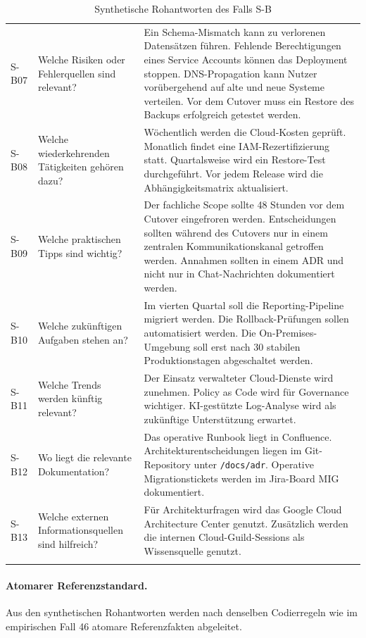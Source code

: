 \documentclass[
  10pt,
  ngerman,
  a4paper,
  toc=graduated,
  numbers=noenddot,
  headings=standardclasses,
  nonumberlist
]{scrartcl}
\newcommand{\code}[1]{\nolinkurl{#1}}
\begin{document}
\begin{longtable}{L{1.0cm}L{4.2cm}L{9.8cm}}
S-B07 & Welche Risiken oder Fehlerquellen sind relevant? & Ein Schema-Mismatch kann zu verlorenen Datensätzen führen. Fehlende Berechtigungen eines Service Accounts können das Deployment stoppen. DNS-Propagation kann Nutzer vorübergehend auf alte und neue Systeme verteilen. Vor dem Cutover muss ein Restore des Backups erfolgreich getestet werden.\\
S-B08 & Welche wiederkehrenden Tätigkeiten gehören dazu? & Wöchentlich werden die Cloud-Kosten geprüft. Monatlich findet eine IAM-Rezertifizierung statt. Quartalsweise wird ein Restore-Test durchgeführt. Vor jedem Release wird die Abhängigkeitsmatrix aktualisiert.\\
S-B09 & Welche praktischen Tipps sind wichtig? & Der fachliche Scope sollte 48 Stunden vor dem Cutover eingefroren werden. Entscheidungen sollten während des Cutovers nur in einem zentralen Kommunikationskanal getroffen werden. Annahmen sollten in einem ADR und nicht nur in Chat-Nachrichten dokumentiert werden.\\
S-B10 & Welche zukünftigen Aufgaben stehen an? & Im vierten Quartal soll die Reporting-Pipeline migriert werden. Die Rollback-Prüfungen sollen automatisiert werden. Die On-Premises-Umgebung soll erst nach 30 stabilen Produktionstagen abgeschaltet werden.\\
S-B11 & Welche Trends werden künftig relevant? & Der Einsatz verwalteter Cloud-Dienste wird zunehmen. Policy as Code wird für Governance wichtiger. KI-gestützte Log-Analyse wird als zukünftige Unterstützung erwartet.\\
S-B12 & Wo liegt die relevante Dokumentation? & Das operative Runbook liegt in Confluence. Architekturentscheidungen liegen im Git-Repository unter \code{/docs/adr}. Operative Migrationstickets werden im Jira-Board MIG dokumentiert.\\
S-B13 & Welche externen Informationsquellen sind hilfreich? & Für Architekturfragen wird das Google Cloud Architecture Center genutzt. Zusätzlich werden die internen Cloud-Guild-Sessions als Wissensquelle genutzt.\\
\bottomrule
\caption{Synthetische Rohantworten des Falls S-B}
\label{tab:synth_sb_interview}
\end{longtable}
\normalsize

\paragraph{Atomarer Referenzstandard.}
Aus den synthetischen Rohantworten werden nach denselben Codierregeln wie im empirischen Fall 46 atomare Referenzfakten abgeleitet.
\end{document}
